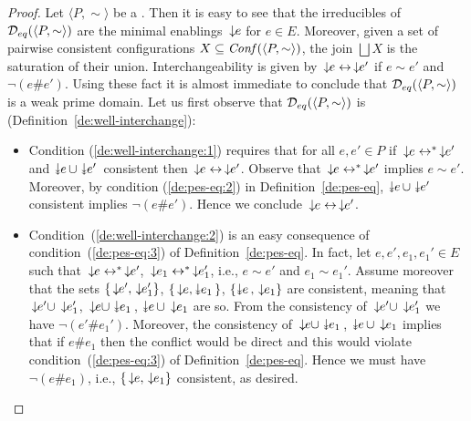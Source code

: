 \begin{proof}
  Let $\langle P, \sim \rangle$ be a {\eseqabbr}.
  Then it is easy to see that the irreducibles of
  $\mathcal{D}_{eq}({\langle P, \sim \rangle})$ are the minimal enablings
  $\,\downarrow\!\!{e}$ for $e \in E$.
  Moreover, given a set of pairwise consistent configurations
  $X \subseteq \mathit{Conf}({\langle P, \sim \rangle})$, the join $\bigsqcup X$
  is the saturation of their union.
  Interchangeability is given by
  $\,\downarrow\!\!{e} \leftrightarrow \,\downarrow\!\!{e'}$
  if $e \sim e'$ and $\neg (e \# e')$.
  Using these fact it is almost immediate to conclude that
    $\mathcal{D}_{eq}({\langle P, \sim \rangle})$ is a weak prime domain. Let us
    first observe that $\mathcal{D}_{eq}({\langle P, \sim \rangle})$ is
    {\wi} (Definition~\ref{de:well-interchange}):
    \begin{itemize}
    \item Condition (\ref{de:well-interchange:1}) requires that for
      all $e, e' \in P$ if $\,\downarrow\!\!{e} \leftrightarrow^* \,\downarrow\!\!{e'}$
      and $\scauses{e} \cup \scauses{e'}$ consistent then
      $\,\downarrow\!\!{e} \leftrightarrow \,\downarrow\!\!{e'}$. Observe that
      $\,\downarrow\!\!{e} \leftrightarrow^* \,\downarrow\!\!{e'}$ implies $e \sim
      e'$. Moreover, by condition (\ref{de:pes-eq:2}) in
      Definition~\ref{de:pes-eq}, $\scauses{e} \cup \scauses{e'}$
      consistent implies $\neg (e \# e')$. Hence we conclude
      $\,\downarrow\!\!{e} \leftrightarrow \,\downarrow\!\!{e'}$.

    
    \item Condition~(\ref{de:well-interchange:2}) is an easy
      consequence of condition~(\ref{de:pes-eq:3}) of
      Definition~\ref{de:pes-eq}. In fact, let
      $e, e', e_1, e_1' \in E$ such that
      $\,\downarrow\!\!{e} \leftrightarrow^* \,\downarrow\!\!{e'}$,
      $\,\downarrow\!\!{e_1} \leftrightarrow^* \,\downarrow\!\!{e_1'}$, i.e.,
      $e \sim e'$ and $e_1 \sim e_1'$. Assume moreover that the sets
      $\{ \,\downarrow\!\!{e'}, \,\downarrow\!\!{e_1'}\}$,
      $\{ \causes{e}, \scauses{e_1}\}$,
      $\{ \scauses{e}, \causes{e_1}\}$ are consistent, meaning that $\,\downarrow\!\!{e'} \cup \,\downarrow\!\!{e_1'}$, $\causes{e} \cup \scauses{e_1}$, 
      $\scauses{e} \cup \causes{e_1}$ are so. From the consistency of $\,\downarrow\!\!{e'} \cup \,\downarrow\!\!{e_1'}$ we have $\neg (e' \# e_1')$. Moreover, the consistency of $\causes{e} \cup \scauses{e_1}$, 
      $\scauses{e} \cup \causes{e_1}$ implies that if $e \# e_1$ then the conflict would be direct and  this would violate condition~(\ref{de:pes-eq:3}) of
      Definition~\ref{de:pes-eq}. Hence we must have $\neg (e \# e_1)$, i.e., $\{  \,\downarrow\!\!{e}, \,\downarrow\!\!{e_1}\}$ consistent, as desired.
    \end{itemize}


\end{proof}
